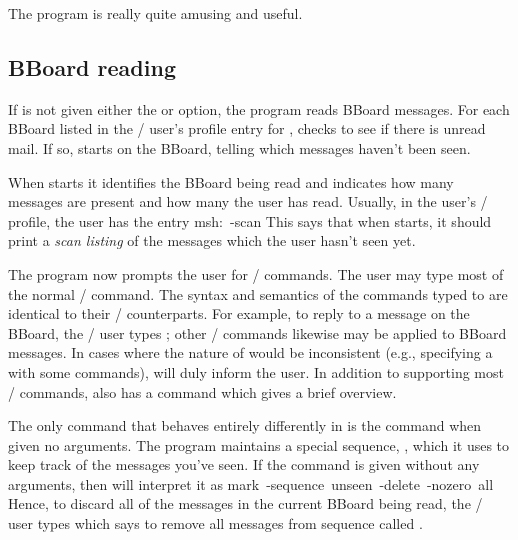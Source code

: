 The  program is really quite amusing and useful.%

\subsection{BBoard reading}
If  is not given either the  or  option,
the  program reads BBoard messages.
For each BBoard listed in the \MH/ user's profile entry for ,
 checks to see if there is unread mail.
If so,  starts  on the BBoard,
telling  which messages haven't been seen.%

When  starts it identifies the BBoard being read and indicates how
many messages are present and how many the user has read.
Usually, in the user's \MH/ profile,
the user has the entry \example msh:\ -scan\endexample
This says that when  starts,
it should print a {\it scan listing} of the messages which the user
hasn't seen yet.

The  program now prompts the user for \MH/ commands.
The user may type most of the normal \MH/ command.
The syntax and semantics of the commands typed to  are identical
to their \MH/ counterparts.
For example, to reply to a message on the BBoard,
the \MH/ user types ;
other \MH/ commands likewise may be applied to BBoard messages.
In cases where the nature of  would be inconsistent
(e.g., specifying a  with some commands),
 will duly inform the user.
In addition to supporting most \MH/ commands,
 also has a  command which gives a brief overview.

The only command that behaves entirely differently in  is the
 command when given no arguments.
The  program maintains a special sequence, ,
which it uses to keep track of the messages you've seen.
If the  command is given without any arguments,
then  will interpret it as
\example mark\ -sequence\ unseen\ -delete\ -nozero\ all\endexample
Hence, to discard all of the messages in the current BBoard being read,
the \MH/ user types  which says to remove all messages from sequence
called .

